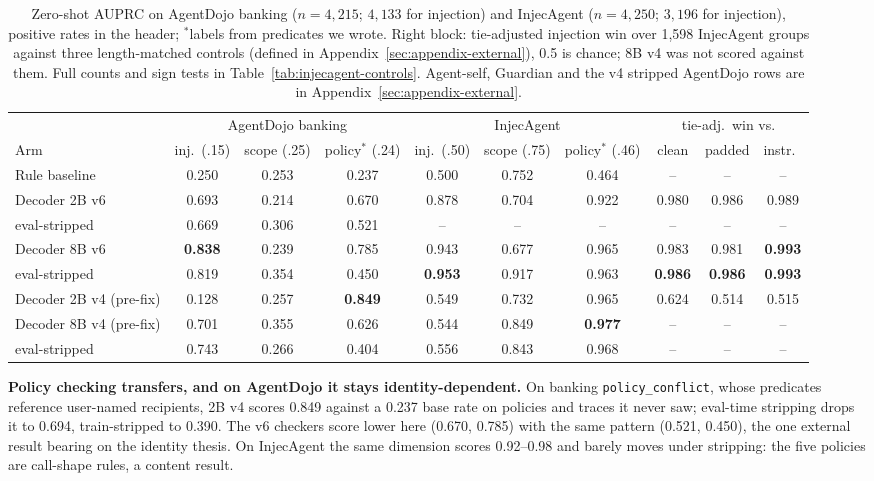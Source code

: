 \begin{table}[t]
\centering
\footnotesize
\setlength{\tabcolsep}{4pt}
\begin{tabular}{@{}lccc|ccc|ccc@{}}
\toprule
& \multicolumn{3}{c|}{AgentDojo banking} & \multicolumn{3}{c|}{InjecAgent} & \multicolumn{3}{c}{tie-adj.\ win vs.} \\
Arm & inj.\ (.15) & scope (.25) & policy$^{\ast}$ (.24) & inj.\ (.50) & scope (.75) & policy$^{\ast}$ (.46) & clean & padded & instr.\ \\
\midrule
Rule baseline & 0.250 & 0.253 & 0.237 & 0.500 & 0.752 & 0.464 & -- & -- & -- \\
\midrule
Decoder 2B v6 & 0.693 & 0.214 & 0.670 & 0.878 & 0.704 & 0.922 & 0.980 & 0.986 & 0.989 \\
\quad eval-stripped & 0.669 & 0.306 & 0.521 & -- & -- & -- & -- & -- & -- \\
Decoder 8B v6 & \textbf{0.838} & 0.239 & 0.785 & 0.943 & 0.677 & 0.965 & 0.983 & 0.981 & \textbf{0.993} \\
\quad eval-stripped & 0.819 & 0.354 & 0.450 & \textbf{0.953} & 0.917 & 0.963 & \textbf{0.986} & \textbf{0.986} & \textbf{0.993} \\
\midrule
Decoder 2B v4 (pre-fix) & 0.128 & 0.257 & \textbf{0.849} & 0.549 & 0.732 & 0.965 & 0.624 & 0.514 & 0.515 \\
Decoder 8B v4 (pre-fix) & 0.701 & 0.355 & 0.626 & 0.544 & 0.849 & \textbf{0.977} & -- & -- & -- \\
\quad eval-stripped & 0.743 & 0.266 & 0.404 & 0.556 & 0.843 & 0.968 & -- & -- & -- \\
\bottomrule
\end{tabular}
\caption{Zero-shot AUPRC on AgentDojo banking ($n{=}4{,}215$; $4{,}133$ for injection) and InjecAgent ($n{=}4{,}250$; $3{,}196$ for injection), positive rates in the header; $^{\ast}$labels from predicates we wrote. Right block: tie-adjusted injection win over 1,598 InjecAgent groups against three length-matched controls (defined in Appendix~\ref{sec:appendix-external}), 0.5 is chance; 8B v4 was not scored against them. Full counts and sign tests in Table~\ref{tab:injecagent-controls}. Agent-self, Guardian and the v4 stripped AgentDojo rows are in Appendix~\ref{sec:appendix-external}.}
\label{tab:external}
\end{table}

\textbf{Policy checking transfers, and on AgentDojo it stays
identity-dependent.} On banking \texttt{policy\_conflict}, whose predicates
reference user-named recipients, 2B v4 scores 0.849 against a 0.237 base
rate on policies and traces it never saw; eval-time stripping drops it to
0.694, train-stripped to 0.390. The v6 checkers
score lower here (0.670, 0.785) with the same pattern (0.521, 0.450), the
one external result bearing on the identity thesis. On InjecAgent the same
dimension scores 0.92--0.98 and barely moves under stripping: the five
policies are call-shape rules, a content result.

